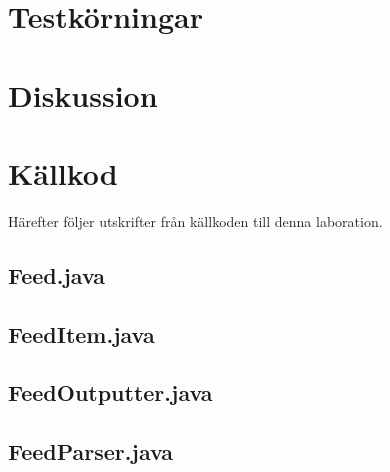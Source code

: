 \documentclass[a4paper, 12pt]{article}
\begin{document}
\section{Testkörningar}\label{Testkorningar}

\section{Diskussion}\label{Diskussion}


\newpage
\appendix
{}
\section{Källkod}\label{Kallkod}
Härefter följer utskrifter från källkoden till denna laboration.

\subsection{Feed.java}\label{Feed.java}
\begin{footnotesize}
  
\end{footnotesize}

\newpage
\subsection{FeedItem.java}\label{FeedItem.java}
\begin{footnotesize}
  
\end{footnotesize}

\newpage
\subsection{FeedOutputter.java}\label{FeedOutputter.java}
\begin{footnotesize}
  
\end{footnotesize}

\newpage
\subsection{FeedParser.java}\label{FeedParser.java}
\begin{footnotesize}
  
\end{footnotesize}
\end{document}

